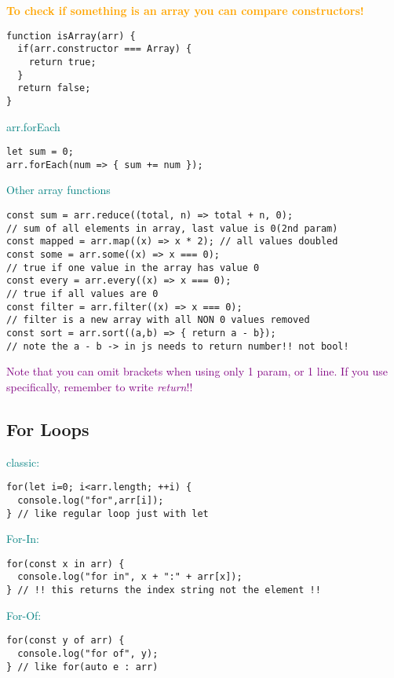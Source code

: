 \documentclass[main.tex,fontsize=6pt,paper=a4,paper=landscape,DIV=calc,]{scrartcl}
\begin{document}
\begin{multicols*}{4}
\begin{itemize}
\end{itemize}
\textcolor{orange}{\textbf{To check if something is an array you can compare constructors!}}\newline
\vspace{-2mm}
\begin{lstlisting}
function isArray(arr) {
  if(arr.constructor === Array) {
    return true;
  }
  return false;
}
\end{lstlisting}
\vspace{2mm}
\textcolor{teal}{arr.forEach}\newline
\vspace{-2mm}
\begin{lstlisting}
let sum = 0;
arr.forEach(num => { sum += num });
\end{lstlisting}
\vspace{2mm}
\textcolor{teal}{Other array functions}\newline
\vspace{-2mm}
\begin{lstlisting}
const sum = arr.reduce((total, n) => total + n, 0); 
// sum of all elements in array, last value is 0(2nd param)
const mapped = arr.map((x) => x * 2); // all values doubled
const some = arr.some((x) => x === 0); 
// true if one value in the array has value 0
const every = arr.every((x) => x === 0); 
// true if all values are 0
const filter = arr.filter((x) => x === 0); 
// filter is a new array with all NON 0 values removed
const sort = arr.sort((a,b) => { return a - b});
// note the a - b -> in js needs to return number!! not bool!
\end{lstlisting}
\vspace{2mm}
\textcolor{purple}{Note that you can omit brackets when using only 1 param, or 1 line. If you use {} specifically, remember to write \emph{return}!!}


\subsection{For Loops}  
\textcolor{teal}{classic:}
\vspace{-2mm}
\begin{lstlisting}
for(let i=0; i<arr.length; ++i) {
  console.log("for",arr[i]);
} // like regular loop just with let
\end{lstlisting}
\vspace{2mm}
\textcolor{teal}{For-In:}
\vspace{-2mm}
\begin{lstlisting}
for(const x in arr) {
  console.log("for in", x + ":" + arr[x]);
} // !! this returns the index string not the element !!
\end{lstlisting}
\vspace{2mm}
\textcolor{teal}{For-Of:}
\vspace{-2mm}
\begin{lstlisting}
for(const y of arr) {
  console.log("for of", y);
} // like for(auto e : arr)
\end{lstlisting}
\vspace{2mm}



\end{multicols*}
\end{document}
